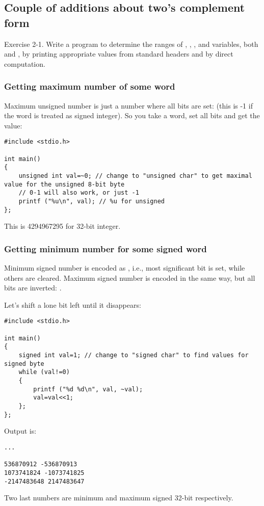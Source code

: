 \subsection{Couple of additions about two's complement form}

\epigraph{Exercise 2-1. Write a program to determine the ranges of , , , and 
variables, both  and , by printing appropriate values from standard headers
and by direct computation.}{\KRBook}

\subsubsection{Getting maximum number of some \gls{word}}

Maximum unsigned number is just a number where all bits are set: 
(this is -1 if the \gls{word} is treated as signed integer).
So you take a \gls{word}, set all bits and get the value:

\begin{lstlisting}[style=customc]
#include <stdio.h>

int main()
{
	unsigned int val=~0; // change to "unsigned char" to get maximal value for the unsigned 8-bit byte
	// 0-1 will also work, or just -1
	printf ("%u\n", val); // %u for unsigned
};
\end{lstlisting}

This is 4294967295 for 32-bit integer.

\subsubsection{Getting minimum number for some signed \gls{word}}

Minimum signed number is encoded as , i.e., most significant bit is set, while others are cleared.
Maximum signed number is encoded in the same way, but all bits are inverted: .

Let's shift a lone bit left until it disappears:

\begin{lstlisting}[style=customc]
#include <stdio.h>

int main()
{
	signed int val=1; // change to "signed char" to find values for signed byte
	while (val!=0)
	{
		printf ("%d %d\n", val, ~val);
		val=val<<1;
	};
};
\end{lstlisting}

Output is:

\begin{lstlisting}
...

536870912 -536870913
1073741824 -1073741825
-2147483648 2147483647
\end{lstlisting}

Two last numbers are minimum and maximum signed 32-bit  respectively.

